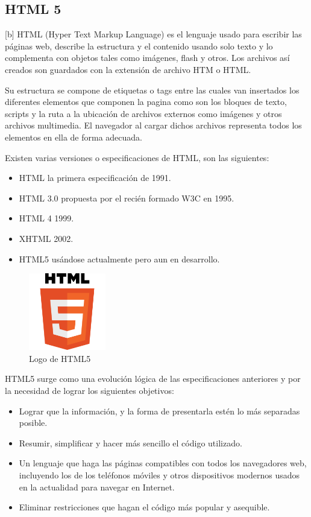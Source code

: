 \subsection{HTML 5}[b]
HTML (Hyper Text Markup Language) es el lenguaje usado para escribir las páginas web, describe la estructura y el contenido usando solo texto y lo complementa con objetos tales como imágenes, flash y otros. Los archivos así creados son guardados con la extensión de archivo HTM o HTML.




Su estructura se compone de etiquetas o tags entre las cuales van insertados los diferentes elementos que componen la pagina como son los bloques de texto, scripts y la ruta a la ubicación de archivos externos como imágenes y otros archivos multimedia. El navegador al cargar dichos archivos representa todos los elementos en ella de forma adecuada.

Existen varias versiones o especificaciones de HTML, son las siguientes:
\begin{itemize}
    \item HTML la primera especificación de 1991.
    \item HTML 3.0 propuesta por el recién formado W3C en 1995.
    \item HTML 4 1999.
    \item XHTML 2002.
    \item HTML5 usándose actualmente pero aun en desarrollo.
\end{itemize}

\begin{figure}[hb]
    \centering
    \includegraphics[width=0.3\textwidth]{imagenes/HTML5-Logo.png}
    \caption{Logo de HTML5}
    \label{fig:logoHTML}
\end{figure}

HTML5 surge como una evolución lógica de las especificaciones anteriores y por la necesidad de lograr los siguientes objetivos:
\begin{itemize}
    \item Lograr que la información, y la forma de presentarla estén lo más separadas posible.
    \item Resumir, simplificar y hacer más sencillo el código utilizado.
    \item Un lenguaje que haga las páginas compatibles con todos los navegadores web, incluyendo los de los teléfonos móviles y otros dispositivos modernos usados en la actualidad para navegar en Internet.
    \item Eliminar restricciones que hagan el código más popular y asequible.
\end{itemize}

